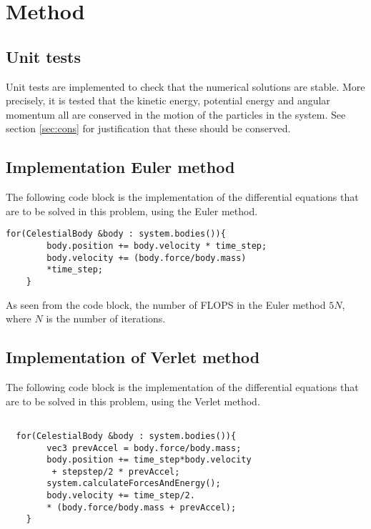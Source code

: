 \section{Method}

\subsection{Unit tests}
Unit tests are implemented to check that the numerical solutions are stable. More precisely, it is tested that the kinetic energy, potential energy and angular momentum all are conserved in the motion of the particles in the system. See section \ref{sec:cons} for justification that these should be conserved. 

\subsection{Implementation Euler method}
The following code block is the implementation of the differential equations that are to be solved in this problem, using the Euler method. 

\begin{lstlisting}[frame=single]
    for(CelestialBody &body : system.bodies()){
        body.position += body.velocity * time_step;
        body.velocity += (body.force/body.mass)
        *time_step;
	} 
\end{lstlisting}

As seen from the code block, the number of FLOPS in the Euler method $5N$, where $N$ is the number of iterations.  

\subsection{Implementation of Verlet method}
The following code block is the implementation of the differential equations that are to be solved in this problem, using the Verlet method. 


\begin{lstlisting}[frame=single]

  for(CelestialBody &body : system.bodies()){
        vec3 prevAccel = body.force/body.mass;
        body.position += time_step*body.velocity
         + stepstep/2 * prevAccel;
        system.calculateForcesAndEnergy();
        body.velocity += time_step/2. 
        * (body.force/body.mass + prevAccel);
    }
\end{lstlisting}